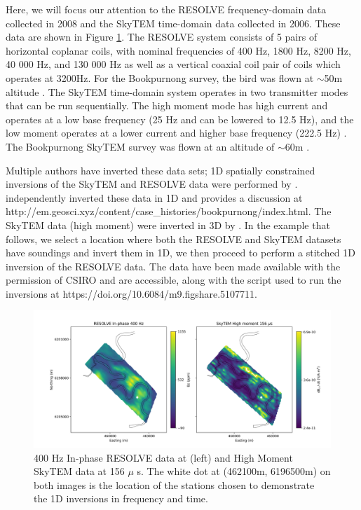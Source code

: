 \documentclass[preprint,review,3p,times,onecolumn,authoryear]{elsarticle}
\begin{document}
Here, we will focus our attention to the RESOLVE frequency-domain data
collected in 2008 and the SkyTEM time-domain data collected in 2006. These data are shown in
Figure \ref{fig:booky_data}. The RESOLVE system consists of 5 pairs of
horizontal coplanar coils, with nominal frequencies of 400 Hz, 1800 Hz, 8200
Hz, 40 000 Hz, and 130 000 Hz as well as a vertical coaxial coil pair of coils which
operates at 3200Hz. For the Bookpurnong survey, the bird was flown at $\sim$50m altitude
\citep{Viezzoli2010}. The SkyTEM time-domain system operates in two
transmitter modes that can be run sequentially. The high moment mode has high
current and operates at a low base frequency (25 Hz and can be lowered to 12.5
Hz), and the low moment operates at a lower current and higher base frequency
(222.5 Hz) \citep{Sorensen2004}. The Bookpurnong SkyTEM survey was flown at an
altitude of $\sim$60m \citep{Viezzoli2010}.

Multiple authors have inverted these data sets; 1D spatially constrained
inversions of the SkyTEM and RESOLVE data were performed by
\citep{Viezzoli2009, Viezzoli2010}. \cite{Yang2017} independently inverted
these data in 1D and provides a discussion at
http://em.geosci.xyz/content/case\_histories/bookpurnong/index.html. The
SkyTEM data (high moment) were inverted in 3D by \citep{Wilson2010}. In the
example that follows, we select a location where both the RESOLVE and SkyTEM
datasets have soundings and invert them in 1D, we then proceed to perform a stitched 1D
inversion of the RESOLVE data. The data have been made available with the
permission of CSIRO and are accessible, along with the script used to run the
inversions at https://doi.org/10.6084/m9.figshare.5107711.

{%
\begin{figure}[htb!]
    \centering
    \includegraphics[width=\textwidth]{images/resolve_skytem_data.png}
\caption{
    400 Hz In-phase RESOLVE data at (left) and High Moment SkyTEM data at 156
    $\mu$ s. The white dot at (462100m, 6196500m) on both images is the
    location of the stations chosen to demonstrate the 1D inversions in
    frequency and time.
}
\label{fig:booky_data}
\end{figure}
}
\end{document}
